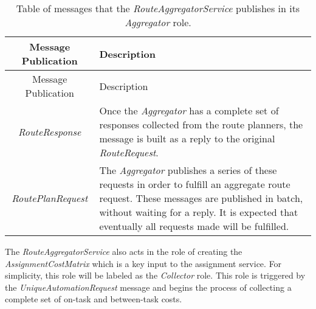 \begin{longtable}[]{@{}cl@{}}
\caption{Table of messages that the \emph{RouteAggregatorService}
publishes in its \emph{Aggregator} role.}\tabularnewline
\toprule
\begin{minipage}[b]{0.40\columnwidth}\centering\strut
Message Publication\strut
\end{minipage} & \begin{minipage}[b]{0.55\columnwidth}\raggedright\strut
Description\strut
\end{minipage}\tabularnewline
\midrule
\endfirsthead
\toprule
\begin{minipage}[b]{0.40\columnwidth}\centering\strut
Message Publication\strut
\end{minipage} & \begin{minipage}[b]{0.55\columnwidth}\raggedright\strut
Description\strut
\end{minipage}\tabularnewline
\midrule
\endhead
\begin{minipage}[t]{0.40\columnwidth}\centering\strut
\emph{RouteResponse}\strut
\end{minipage} & \begin{minipage}[t]{0.55\columnwidth}\raggedright\strut
Once the \emph{Aggregator} has a complete set of responses collected
from the route planners, the message is built as a reply to the original
\emph{RouteRequest}.\strut
\end{minipage}\tabularnewline
\begin{minipage}[t]{0.40\columnwidth}\centering\strut
\emph{RoutePlanRequest}\strut
\end{minipage} & \begin{minipage}[t]{0.55\columnwidth}\raggedright\strut
The \emph{Aggregator} publishes a series of these requests in order to
fulfill an aggregate route request. These messages are published in
batch, without waiting for a reply. It is expected that eventually all
requests made will be fulfilled.\strut
\end{minipage}\tabularnewline
\bottomrule
\end{longtable}

The \emph{RouteAggregatorService} also acts in the role of creating the
\emph{AssignmentCostMatrix} which is a key input to the assignment
service. For simplicity, this role will be labeled as the
\emph{Collector} role. This role is triggered by the
\emph{UniqueAutomationRequest} message and begins the process of
collecting a complete set of on-task and between-task costs.

